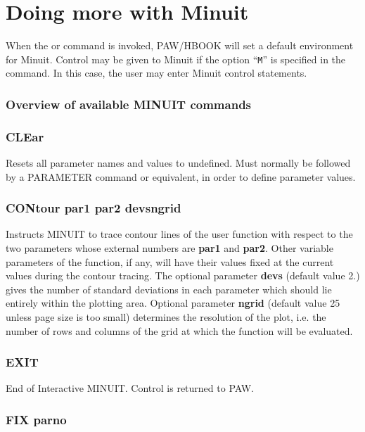 \section{Doing more with Minuit}
\label{sec:H2MWMIN}

When the  or  command is
invoked, PAW/HBOOK
will set a default environment for Minuit. Control may be given to Minuit
if the option ``\texttt{M}'' is specified in the command.
In this case, the user
may enter Minuit control statements.

\subsubsection{Overview of available MINUIT commands}

\subsubsection*{CLEar}

Resets all parameter names and values to undefined. Must normally be
followed by a PARAMETER command or equivalent, in order to define
parameter values.

\subsubsection*{CONtour  par1  par2  \lsb devs\rsb   \lsb ngrid\rsb }

Instructs MINUIT to trace contour lines of the user function with
respect to the two parameters whose external numbers are {\bf par1}
and {\bf par2}.
Other variable parameters of the function, if any, will have their
values fixed at the current values during the contour tracing.
The optional parameter {\bf \lsb devs\rsb } (default value 2.)
gives the number of
standard deviations in each parameter which should lie entirely within
the plotting area. Optional parameter {\bf \lsb ngrid\rsb }
(default value 25 unless
page size is too small) determines the resolution of the plot, i.e.
the number of rows and columns of the grid at which the function
will be evaluated.

\subsubsection*{EXIT}

End of Interactive MINUIT. Control is returned to PAW.

\subsubsection*{FIX  parno}

